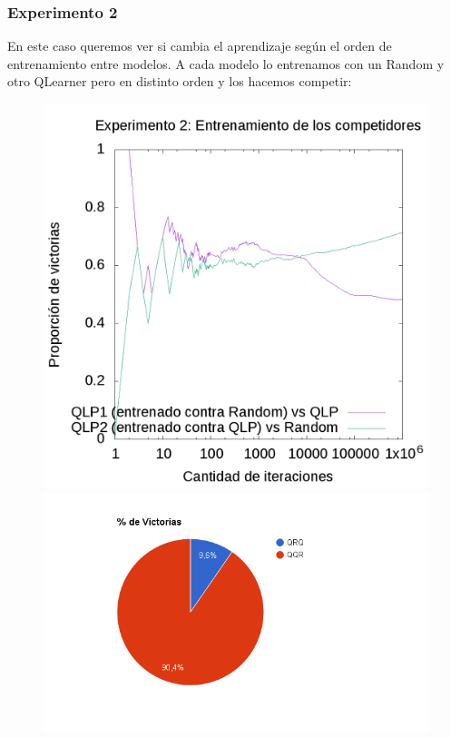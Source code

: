 \documentclass[10pt, a4paper]{article}
\begin{document}
\subsubsection{Experimento 2}


En este caso queremos ver si cambia el aprendizaje según el orden de entrenamiento entre modelos. A cada modelo lo entrenamos con un Random y otro QLearner pero en distinto orden y los hacemos competir:


\begin{figure}[H]
  \begin{minipage}[c]{1\textwidth}
  \includegraphics[scale=0.2]{E2train.png}
  \includegraphics[scale=0.45]{QQRvsQRQ.png}
  \end{minipage}
\end{figure}
\end{document}
